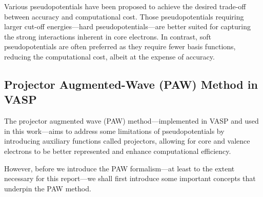Various pseudopotentials have been proposed to achieve the desired 
trade-off between accuracy and computational cost. Those pseudopotentials requiring 
larger cut-off energies---hard pseudopotentials---are better suited for capturing 
the strong interactions inherent in core electrons. In contrast, soft pseudopotentials 
are often preferred as they require fewer basis functions, reducing the 
computational cost, albeit at the expense of accuracy.

\subsection{Projector Augmented-Wave (PAW) Method in VASP}
The projector augmented wave (PAW) method---implemented in VASP and 
used in this work---aims to address some limitations of pseudopotentials 
by introducing auxiliary functions called projectors, allowing for core and valence electrons 
to be better represented and enhance computational efficiency. 

However, before we introduce the PAW formalism---at least to the extent
necessary for this report---we shall first introduce some important concepts 
that underpin the PAW method.
